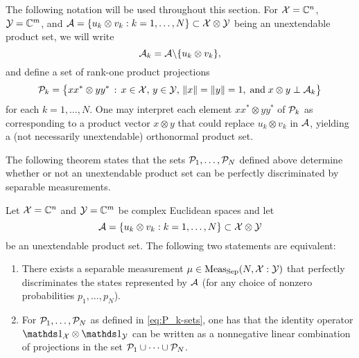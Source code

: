 The following notation will be used throughout this section.
For $\X=\complex^n$, $\Y=\complex^m$, and
$\A = \{ u_{k}\otimes v_{k} : k = 1, \ldots, N \} \subset \X\otimes\Y$
being an unextendable product set, we will write
\begin{equation}
  \A_k = \A \backslash \{u_k \otimes v_k\},
\end{equation}
and define a set of rank-one
product projections
\begin{equation}
\label{eq:P_k-sets}
\P_k = \bigl\{ x x^{\ast} \otimes y y^{\ast}\,:\,
x\in\X,\,y\in\Y,\,\norm{x} = \norm{y} =1,\;\text{and}\;
x\otimes y\perp \A_k\bigr\}
\end{equation}
for each $k = 1,\ldots,N$.
One may interpret each element $x x^{\ast} \otimes y y^{\ast}$ of 
$\P_k$ as corresponding to a product vector $x \otimes y$ that could replace
$u_k \otimes v_k$ in $\A$, yielding a (not necessarily unextendable)
orthonormal product set.

The following theorem states that the sets $\P_1,\ldots,\P_N$ defined above
determine whether or not an unextendable product set can be perfectly
discriminated by separable measurements.

\begin{theorem}\label{thm:upb_sep_characterize}
  Let $\X=\complex^n$ and $\Y=\complex^m$ be complex Euclidean spaces and let
  \begin{equation}
    \A = \{ u_{k}\otimes v_{k} : k = 1, \ldots, N \} \subset \X\otimes\Y
  \end{equation}
  be an unextendable product set.
  The following two statements are equivalent:
  \begin{enumerate}
  \item
    There exists a separable measurement $\mu \in \Meas_{\Sep}(N, \X:\Y)$
    that perfectly discriminates the
    states represented by $\A$ (for any choice of nonzero probabilities
    $p_1,\ldots,p_N$).
  \item
    For $\P_1,\ldots,\P_N$ as defined in \eqref{eq:P_k-sets}, one has that the
    identity operator $\I_{\X}\otimes\I_{\Y}$ can be written as a nonnegative
    linear combination of projections in the set $\P_1\cup\cdots\cup \P_N$.
  \end{enumerate}
\end{theorem}

